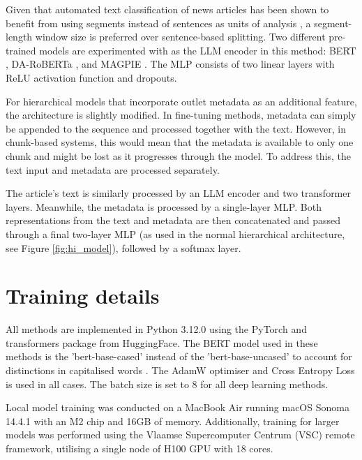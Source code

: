 Given that automated text classification of news articles has been shown to benefit from using segments instead of sentences as units of analysis \cite{barbera-2021-article-classification}, a segment-length window size is preferred over sentence-based splitting. Two different pre-trained models are experimented with as the LLM encoder in this method: BERT \cite{devlin-2019-bert}, DA-RoBERTa \cite{krieger-2022-domain}, and MAGPIE \cite{horych-2024-magpie}. The MLP consists of two linear layers with ReLU activation function \cite{agarap-2018-relu} and dropouts.

For hierarchical models that incorporate outlet metadata as an additional feature, the architecture is slightly modified. In fine-tuning methods, metadata can simply be appended to the sequence and processed together with the text. However, in chunk-based systems, this would mean that the metadata is available to only one chunk and might be lost as it progresses through the model. To address this, the text input and metadata are processed separately.

The article's text is similarly processed by an LLM encoder and two transformer layers. Meanwhile, the metadata is processed by a single-layer MLP. Both representations from the text and metadata are then concatenated and passed through a final two-layer MLP (as used in the normal hierarchical architecture, see Figure \ref{fig:hi_model}), followed by a softmax layer.

\section{Training details}

All methods are implemented in Python 3.12.0 \cite{van-1995-python} using the PyTorch \cite{paszke-2017-pytorch} and transformers \cite{wolf-2020-huggingface} package from HuggingFace. The BERT model used in these methods is the 'bert-base-cased' instead of the 'bert-base-uncased' to account for distinctions in capitalised words \cite{devlin-2019-bert}. The AdamW \cite{loshchilov-2019-adamw} optimiser and Cross Entropy Loss is used in all cases. The batch size is set to 8 for all deep learning methods.

Local model training was conducted on a MacBook Air running macOS Sonoma 14.4.1 with an M2 chip and 16GB of memory. Additionally, training for larger models was performed using the Vlaamse Supercomputer Centrum (VSC) \cite{vscentrum} remote framework, utilising a single node of H100 GPU with 18 cores.


